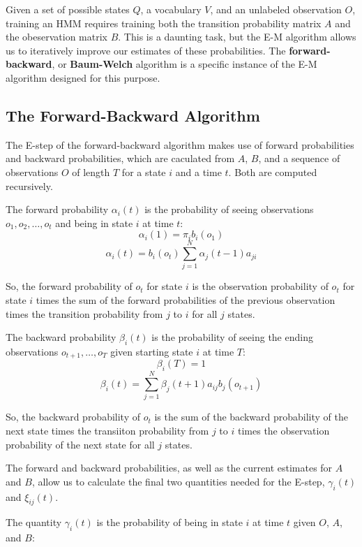 \documentclass[14pt]{article}
\begin{document}
Given a set of possible states $Q$, a vocabulary $V$, and an unlabeled observation $O$, training an HMM requires training both the transition probability matrix $A$ and the obeservation matrix $B$.  This is a daunting task, but the E-M algorithm allows us to iteratively improve our estimates of these probabilities.  The \textbf{forward-backward}, or \textbf{Baum-Welch} algorithm is a specific instance of the E-M algorithm designed for this purpose.

\begin{center}
\subsection*{The Forward-Backward Algorithm}
\end{center}

The E-step of the forward-backward algorithm makes use of forward probabilities and backward probabilities, which are caculated from $A$, $B$, and a sequence of observations $O$ of length $T$ for a state $i$ and a time $t$.  Both are computed recursively.

The forward probability $\alpha_i(t)$ is the probability of seeing observations $o_1,o_2,\ldots,o_t$ and being in state $i$ at time $t$:
$$\alpha_i(1) = \pi_ib_i(o_1)$$
$$\alpha_i(t) = b_i(o_t)\sum_{j=1}^N \alpha_j(t-1)a_{ji}$$

So, the forward probability of $o_t$ for state $i$ is the observation probability of $o_t$ for state $i$ times the sum of the forward probabilities of the previous observation times the transition probability from $j$ to $i$ for all $j$ states.

The backward probability $\beta_i(t)$ is the probability of seeing the ending observations $o_{t+1},\ldots,o_T$ given starting state $i$ at time $T$:
$$\beta_i(T) = 1$$
$$\beta_i(t) = \sum_{j=1}^N \beta_j(t+1)a_{ij}b_j(o_{t+1})$$

So, the backward probability of $o_t$ is the sum of the backward probability of the next state times the transiiton probability from $j$ to $i$ times the observation probability of the next state for all $j$ states.

The forward and backward probabilities, as well as the current estimates for $A$ and $B$, allow us to calculate the final two quantities needed for the E-step, $\gamma_i(t)$ and $\xi_{ij}(t)$.

The quantity $\gamma_i(t)$ is the probability of being in state $i$ at time $t$ given $O$, $A$, and $B$:
\end{document}

